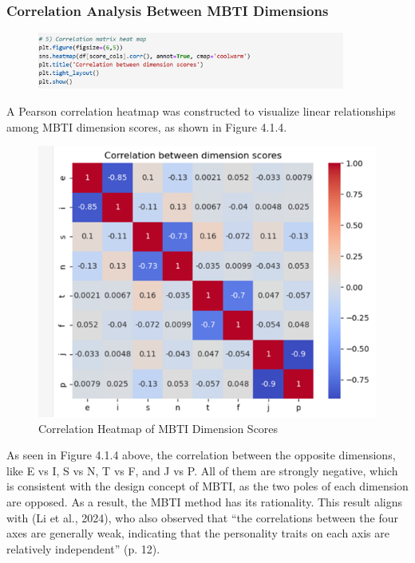 \documentclass[12pt]{article}
\begin{document}
	\subsubsection{Correlation Analysis Between MBTI Dimensions}
	\begin{figure}[H]
		\centering
		\includegraphics[width=0.9\textwidth]{Q1EDA8}
		
	\end{figure}	
	A Pearson correlation heatmap was constructed to visualize linear relationships among MBTI dimension scores, as shown in Figure 4.1.4.
	\begin{figure}[H]
		\centering
		\includegraphics{Q1EDA9} 
		\caption{Correlation Heatmap of MBTI Dimension Scores}		
	\end{figure}
	
	As seen in Figure 4.1.4 above, the correlation between the opposite dimensions, like E vs I, S vs N, T vs F, and J vs P. All of them are strongly negative, which is consistent with the design concept of MBTI, as the two poles of each dimension are opposed. As a result, the MBTI method has its rationality. This result aligns with (Li et al., 2024), who also observed that “the correlations between the four axes are generally weak, indicating that the personality traits on each axis are relatively independent” (p. 12).
	
\end{document}
